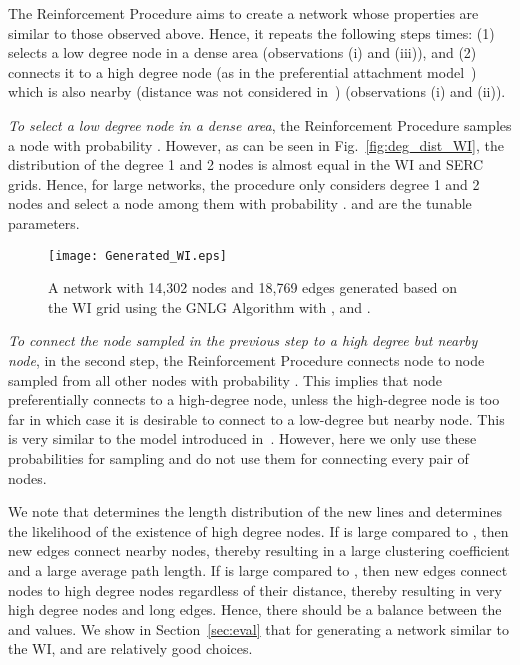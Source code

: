 \documentclass[10pt,journal]{IEEEtran}
\begin{document}
The Reinforcement Procedure aims to create a network whose properties are similar to those observed above. Hence, it repeats the following steps  times: (1) selects a low degree node in a dense area (observations (i) and (iii)), and (2) connects it to a high degree node (as in the preferential attachment model~\cite{barabasi1999emergence}) which is also nearby (distance was not considered in~\cite{barabasi1999emergence}) (observations (i) and (ii)).

\emph{To select a low degree node in a dense area},
the Reinforcement Procedure samples a node  with probability . However, as can be seen in Fig.~\ref{fig:deg_dist_WI}, the distribution of the degree 1 and 2 nodes is almost equal in the WI and SERC grids.
Hence, for large networks, the procedure only considers degree 1 and 2 nodes and select a node among them with probability .  and  are the tunable parameters.

\begin{figure}[t]
\centering
\vspace*{-0.2cm}
\texttt{[image: Generated\_WI.eps]}
\vspace*{-0.2cm}
\caption{A network with 14,302 nodes and 18,769 edges generated based on the WI grid using the GNLG Algorithm with ,  and .}
\label{fig:Generated_WI}
\vspace*{0.2cm}
\end{figure}


\emph{To connect the node sampled in the previous step to a high degree but nearby node}, in the second step, the Reinforcement Procedure connects node  to node  sampled from all other nodes with probability .
This implies that node  preferentially connects to a high-degree node, unless the high-degree node is too far in which case it is desirable to connect to a low-degree but nearby node. This is very similar to the model introduced in~\cite{manna2002modulated,xulvi2002evolving}. However, here we only use these probabilities for sampling and do not use them for connecting every pair of nodes.


We note that  determines the length distribution of the new lines and  determines the likelihood of the existence of high degree nodes. If  is large compared to , then new edges connect nearby nodes, thereby resulting in a large clustering coefficient and  a large average path length. If  is large compared to , then new edges connect nodes to high degree nodes regardless of their distance, thereby resulting in very high degree nodes and long edges. Hence, there should be a balance between the  and  values. We show in Section~\ref{sec:eval} that for generating a network similar to the WI,  and  are relatively good choices.
\end{document}
